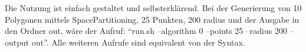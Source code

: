 Die Nutzung ist einfach gestaltet und selbsterklärend. Bei der Generierung von 10 Polygonen mittels SpacePartitioning, 25 Punkten, 200 radius und der Ausgabe in den Ordner out, wäre der Aufruf: \enquote{run.sh --algorithm 0 --points 25 --radius 200 --output out}. Alle weiteren Aufrufe sind equivalent von der Syntax.